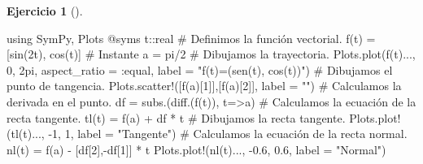 \documentclass[
  a4paper,
]{scrreport}
\newenvironment{Shaded}{\begin{snugshade}}{\end{snugshade}}
\newcommand{\BuiltInTok}[1]{\textcolor[rgb]{0.00,0.23,0.31}{#1}}
\newcommand{\CommentTok}[1]{\textcolor[rgb]{0.37,0.37,0.37}{#1}}
\newcommand{\ConstantTok}[1]{\textcolor[rgb]{0.56,0.35,0.01}{#1}}
\newcommand{\DataTypeTok}[1]{\textcolor[rgb]{0.68,0.00,0.00}{#1}}
\newcommand{\FloatTok}[1]{\textcolor[rgb]{0.68,0.00,0.00}{#1}}
\newcommand{\FunctionTok}[1]{\textcolor[rgb]{0.28,0.35,0.67}{#1}}
\newcommand{\ImportTok}[1]{\textcolor[rgb]{0.00,0.46,0.62}{#1}}
\newcommand{\NormalTok}[1]{\textcolor[rgb]{0.00,0.23,0.31}{#1}}
\newcommand{\OperatorTok}[1]{\textcolor[rgb]{0.37,0.37,0.37}{#1}}
\newcommand{\PreprocessorTok}[1]{\textcolor[rgb]{0.68,0.00,0.00}{#1}}
\newcommand{\StringTok}[1]{\textcolor[rgb]{0.13,0.47,0.30}{#1}}
\theoremstyle{definition}
\newtheorem{exercise}{Ejercicio}[chapter]
\theoremstyle{remark}
\begin{document}
\begin{exercise}[]
\begin{enumerate}
\begin{tcolorbox}
\begin{Shaded}
\begin{Highlighting}[]
\ImportTok{using} \BuiltInTok{SymPy}\NormalTok{, }\BuiltInTok{Plots}
\PreprocessorTok{@syms}\NormalTok{ t}\OperatorTok{::}\DataTypeTok{real}
\CommentTok{\# Definimos la función vectorial.}
\FunctionTok{f}\NormalTok{(t) }\OperatorTok{=}\NormalTok{ [}\FunctionTok{sin}\NormalTok{(}\FloatTok{2}\NormalTok{t), }\FunctionTok{cos}\NormalTok{(t)]}
\CommentTok{\# Instante }
\NormalTok{a }\OperatorTok{=} \ConstantTok{pi}\OperatorTok{/}\FloatTok{2}
\CommentTok{\# Dibujamos la trayectoria.}
\NormalTok{Plots.}\FunctionTok{plot}\NormalTok{(}\FunctionTok{f}\NormalTok{(t)}\OperatorTok{...}\NormalTok{, }\FloatTok{0}\NormalTok{, }\FloatTok{2}\NormalTok{pi, aspect\_ratio }\OperatorTok{=} \OperatorTok{:}\NormalTok{equal, label }\OperatorTok{=} \StringTok{"f(t)=(sen(t), cos(t))"}\NormalTok{)}
\CommentTok{\# Dibujamos el punto de tangencia.}
\NormalTok{Plots.}\FunctionTok{scatter!}\NormalTok{([}\FunctionTok{f}\NormalTok{(a)[}\FloatTok{1}\NormalTok{]],[}\FunctionTok{f}\NormalTok{(a)[}\FloatTok{2}\NormalTok{]], label }\OperatorTok{=} \StringTok{""}\NormalTok{)}
\CommentTok{\# Calculamos la derivada en el punto.}
\NormalTok{df }\OperatorTok{=} \FunctionTok{subs}\NormalTok{.(}\FunctionTok{diff}\NormalTok{.(}\FunctionTok{f}\NormalTok{(t)), t}\OperatorTok{=\textgreater{}}\NormalTok{a)}
\CommentTok{\# Calculamos la ecuación de la recta tangente.}
\FunctionTok{tl}\NormalTok{(t) }\OperatorTok{=} \FunctionTok{f}\NormalTok{(a) }\OperatorTok{+}\NormalTok{ df }\OperatorTok{*}\NormalTok{ t}
\CommentTok{\# Dibujamos la recta tangente.}
\NormalTok{Plots.}\FunctionTok{plot!}\NormalTok{(}\FunctionTok{tl}\NormalTok{(t)}\OperatorTok{...}\NormalTok{, }\OperatorTok{{-}}\FloatTok{1}\NormalTok{, }\FloatTok{1}\NormalTok{, label }\OperatorTok{=} \StringTok{"Tangente"}\NormalTok{)}
\CommentTok{\# Calculamos la ecuación de la recta normal.}
\FunctionTok{nl}\NormalTok{(t) }\OperatorTok{=} \FunctionTok{f}\NormalTok{(a) }\OperatorTok{{-}}\NormalTok{ [df[}\FloatTok{2}\NormalTok{],}\OperatorTok{{-}}\NormalTok{df[}\FloatTok{1}\NormalTok{]] }\OperatorTok{*}\NormalTok{ t}
\NormalTok{Plots.}\FunctionTok{plot!}\NormalTok{(}\FunctionTok{nl}\NormalTok{(t)}\OperatorTok{...}\NormalTok{, }\OperatorTok{{-}}\FloatTok{0.6}\NormalTok{, }\FloatTok{0.6}\NormalTok{, label }\OperatorTok{=} \StringTok{"Normal"}\NormalTok{)}
\end{Highlighting}
\end{Shaded}

  \begin{figure}[H]


\end{figure}
\end{tcolorbox}
\end{enumerate}
\end{exercise}
\end{document}
